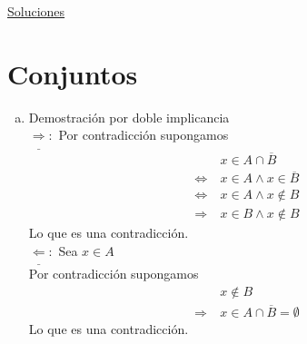 \documentclass[dcc]{fcfmcourse}
\begin{document}


\newpage
\begin{center}
{\huge \underline{Soluciones}}
\end{center}
\section*{Conjuntos}
\begin{problems}
\problem 
\begin{enumerate}[a)]
\item Demostración por doble implicancia\\

$\underline{\Rightarrow}:$ Por contradicción supongamos
\begin{align*}
&x \in A \cap \overline{B}\\
\Leftrightarrow\ & x \in A \land x \in \overline{B}\\
\Leftrightarrow\ & x \in A \land x \not\in B\\
\Rightarrow\ & x\in B \land x \not\in B
\end{align*}
Lo que es una contradicción.\\


$\underline{\Leftarrow}:$ Sea $x \in A$ \\
Por contradicción supongamos
\begin{align*}
&x \not\in B\\
\Rightarrow\ & x\in A \cap \overline{B} = \emptyset
\end{align*}
Lo que es una contradicción.\\


\end{enumerate}
\end{problems}
\end{document}
